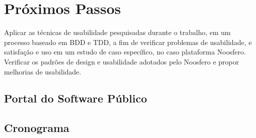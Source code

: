 \section{Próximos Passos}

Aplicar as técnicas de usabilidade pesquisadas durante o trabalho, em um processo baseado em BDD e TDD, a fim de verificar problemas de usabilidade, e satisfação e uso em um estudo de caso específico, no caso plataforma Noosfero.
Verificar os padrões de design  e usabilidade adotados pelo Noosfero e propor melhorias de usabilidade.

\subsection{Portal do Software Público}
\subsection{Cronograma}